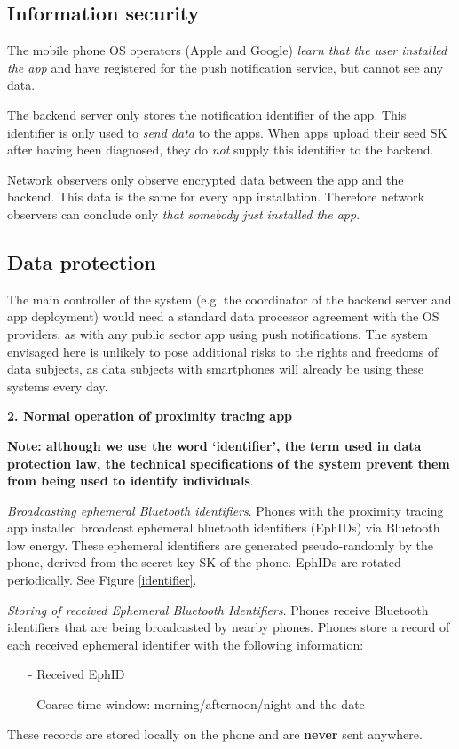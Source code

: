 \documentclass[12pt,a4paper]{article}
\begin{document}
\subsection*{Information security}
The mobile phone OS operators (Apple and Google) \textit{learn that the user installed the app} and have registered for the push notification service, but cannot see any data.


The backend server only stores the notification identifier of the app. This identifier is only used to \textit{send data} to the apps. When apps upload their seed SK after having been diagnosed, they do \textit{not}  supply this identifier to the backend.


Network observers only observe encrypted data between the app and the backend. This
data is the same for every app installation. Therefore network observers can conclude only
\textit{that somebody just installed the app}.
\subsection*{Data protection}
The main controller of the system (e.g. the coordinator of the backend server and app
deployment) would need a standard data processor agreement with the OS providers, as
with any public sector app using push notifications. The system envisaged here is unlikely to pose additional risks to the rights and freedoms of data subjects, as data subjects with smartphones will already be using these systems every day.


\textbf{2. Normal operation of proximity tracing app}


\textbf{Note: although we use the word ‘identifier’, the term used in data protection law, the technical specifications of the system prevent them from being used to identify
individuals}.


\textit{Broadcasting ephemeral Bluetooth identifiers}. Phones with the proximity tracing app installed broadcast ephemeral bluetooth identifiers (EphIDs) via Bluetooth low energy. These ephemeral identifiers are generated pseudo-randomly by the phone, derived from the secret key SK of the phone. EphIDs are rotated periodically. See Figure \ref{identifier}.


\textit{Storing of received Ephemeral Bluetooth Identifiers}. Phones receive Bluetooth identifiers that are being broadcasted by nearby phones. Phones store a record of each received ephemeral identifier with the following information:
\begin{itemize}\itemsep0pt
\item[-] Received EphID
\item[-] Coarse time window: morning/afternoon/night and the date
\end{itemize}
These records are stored locally on the phone and are \textbf{never} sent anywhere.
\end{document}
